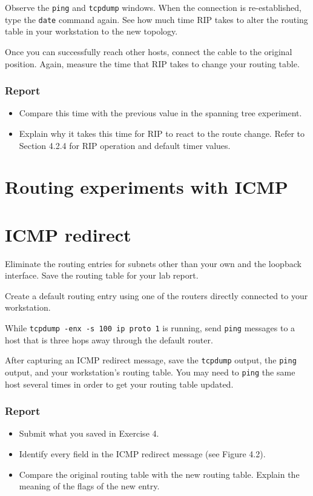 \documentclass{../UTNetLab}
\begin{document}
    Observe the \lstinline{ping} and \lstinline{tcpdump} windows.
    When the connection is re-established, type the \lstinline{date} command again.
    See how much time RIP takes to alter the routing table in your workstation to the new topology.

    Once you can successfully reach other hosts, connect the cable to the original position.
    Again, measure the time that RIP takes to change your routing table.
    
    \subsubsection*{Report}
    \begin{itemize}
        \item Compare this time with the previous value in the spanning tree experiment.
        \item Explain why it takes this time for RIP to react to the route change.
        Refer to Section 4.2.4 for RIP operation and default timer values.
    \end{itemize}


\section*{Routing experiments with ICMP}
\section{ICMP redirect}
    Eliminate the routing entries for subnets other than your own and the loopback interface.
    Save the routing table for your lab report.

    Create a default routing entry using one of the routers directly connected to your workstation.

    While \lstinline{tcpdump -enx -s 100 ip proto 1} is running, send \lstinline{ping} messages to a host that is three hops away through the default router.

    After capturing an ICMP redirect message, save the \lstinline{tcpdump} output, the \lstinline{ping} output, and your workstation’s routing table.
    You may need to \lstinline{ping} the same host several times in order to get your routing table updated.
    
    \subsubsection*{Report}
    \begin{itemize}
        \item Submit what you saved in Exercise 4.
        \item Identify every field in the ICMP redirect message (see Figure 4.2).
        \item Compare the original routing table with the new routing table. Explain the meaning of the flags of the new entry.
    \end{itemize}
\end{document}
